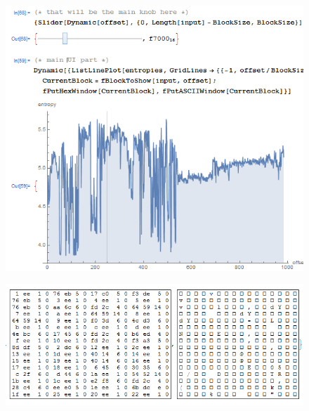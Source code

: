 \begin{figure}[H]
\centering
\includegraphics[width=\EntropyGfxScale]{ff/entropy/geoipisp11.png}
\end{figure}

\begin{figure}[H]
\centering
\includegraphics[width=\EntropyGfxScale]{ff/entropy/geoipisp12.png}
\end{figure}
